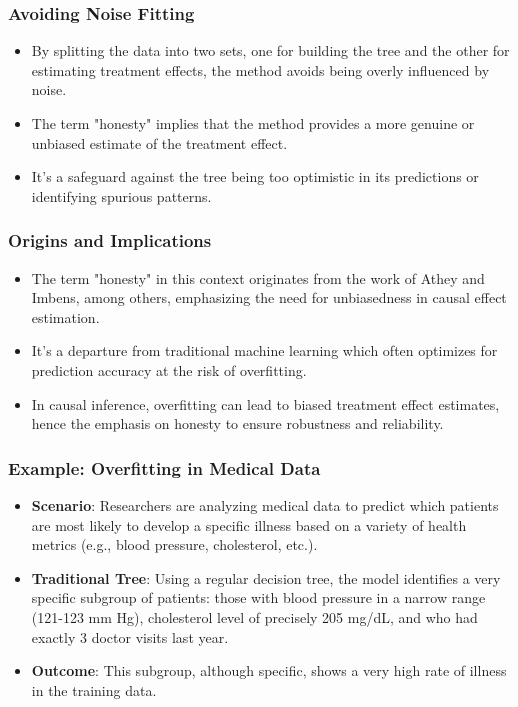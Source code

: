\documentclass{beamer}
\begin{document}
\begin{frame}
\frametitle{Avoiding Noise Fitting}
\begin{itemize}
\item By splitting the data into two sets, one for building the tree and the other for estimating treatment effects, the method avoids being overly influenced by noise.
\item The term "honesty" implies that the method provides a more genuine or unbiased estimate of the treatment effect.
\item It's a safeguard against the tree being too optimistic in its predictions or identifying spurious patterns.
\end{itemize}
\end{frame}

\begin{frame}
\frametitle{Origins and Implications}
\begin{itemize}
\item The term "honesty" in this context originates from the work of Athey and Imbens, among others, emphasizing the need for unbiasedness in causal effect estimation.
\item It's a departure from traditional machine learning which often optimizes for prediction accuracy at the risk of overfitting.
\item In causal inference, overfitting can lead to biased treatment effect estimates, hence the emphasis on honesty to ensure robustness and reliability.
\end{itemize}
\end{frame}

\begin{frame}
\frametitle{Example: Overfitting in Medical Data}
\begin{itemize}
\item \textbf{Scenario}: Researchers are analyzing medical data to predict which patients are most likely to develop a specific illness based on a variety of health metrics (e.g., blood pressure, cholesterol, etc.).
\item \textbf{Traditional Tree}: Using a regular decision tree, the model identifies a very specific subgroup of patients: those with blood pressure in a narrow range (121-123 mm Hg), cholesterol level of precisely 205 mg/dL, and who had exactly 3 doctor visits last year.
\item \textbf{Outcome}: This subgroup, although specific, shows a very high rate of illness in the training data.
\end{itemize}
\end{frame}
\end{document}

